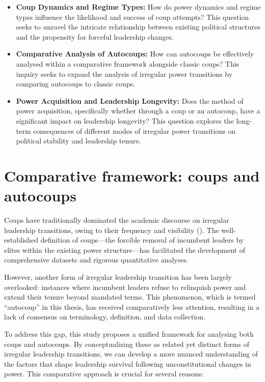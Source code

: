 \documentclass[
  12pt,
]{report}
\begin{document}
\begin{itemize}
\item
  \textbf{Coup Dynamics and Regime Types:} How do power dynamics and
  regime types influence the likelihood and success of coup attempts?
  This question seeks to unravel the intricate relationship between
  existing political structures and the propensity for forceful
  leadership changes.
\item
  \textbf{Comparative Analysis of Autocoups:} How can autocoups be
  effectively analysed within a comparative framework alongside classic
  coups? This inquiry seeks to expand the analysis of irregular power
  transitions by comparing autocoups to classic coups.
\item
  \textbf{Power Acquisition and Leadership Longevity:} Does the method
  of power acquisition, specifically whether through a coup or an
  autocoup, have a significant impact on leadership longevity? This
  question explores the long-term consequences of different modes of
  irregular power transitions on political stability and leadership
  tenure.
\end{itemize}

\section{Comparative framework: coups and
autocoups}\label{comparative-framework-coups-and-autocoups}

Coups have traditionally dominated the academic discourse on irregular
leadership transitions, owing to their frequency and visibility
(). The well-established
definition of coups---the forcible removal of incumbent leaders by
elites within the existing power structure---has facilitated the
development of comprehensive datasets and rigorous quantitative
analyses.

However, another form of irregular leadership transition has been
largely overlooked: instances where incumbent leaders refuse to
relinquish power and extend their tenure beyond mandated terms. This
phenomenon, which is termed ``autocoup'' in this thesis, has received
comparatively less attention, resulting in a lack of consensus on
terminology, definition, and data collection.

To address this gap, this study proposes a unified framework for
analysing both coups and autocoups. By conceptualizing these as related
yet distinct forms of irregular leadership transitions, we can develop a
more nuanced understanding of the factors that shape leadership survival
following unconstitutional changes in power. This comparative approach
is crucial for several reasons:
\end{document}
